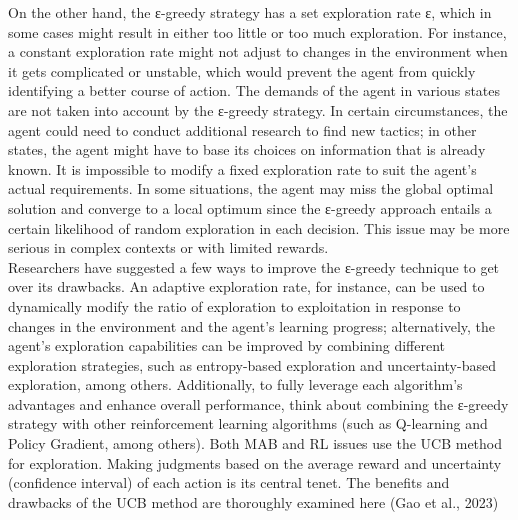 \documentclass[a4paper,11pt,onecolumn]{article}
\begin{document}
On the other hand, the ε-greedy strategy has a set exploration rate ε, which in some cases might result in either too little or too much exploration. For instance, a constant exploration rate might not adjust to changes in the environment when it gets complicated or unstable, which would prevent the agent from quickly identifying a better course of action. The demands of the agent in various states are not taken into account by the ε-greedy strategy. In certain circumstances, the agent could need to conduct additional research to find new tactics; in other states, the agent might have to base its choices on information that is already known. It is impossible to modify a fixed exploration rate to suit the agent's actual requirements.  In some situations, the agent may miss the global optimal solution and converge to a local optimum since the ε-greedy approach entails a certain likelihood of random exploration in each decision. This issue may be more serious in complex contexts or with limited rewards.\\
Researchers have suggested a few ways to improve the ε-greedy technique to get over its drawbacks. An adaptive exploration rate, for instance, can be used to dynamically modify the ratio of exploration to exploitation in response to changes in the environment and the agent's learning progress; alternatively, the agent's exploration capabilities can be improved by combining different exploration strategies, such as entropy-based exploration and uncertainty-based exploration, among others. Additionally, to fully leverage each algorithm's advantages and enhance overall performance, think about combining the ε-greedy strategy with other reinforcement learning algorithms (such as Q-learning and Policy Gradient, among others). Both MAB and RL issues use the UCB method for exploration. Making judgments based on the average reward and uncertainty (confidence interval) of each action is its central tenet. The benefits and drawbacks of the UCB method are thoroughly examined here (Gao et al., 2023)\\
\end{document}
